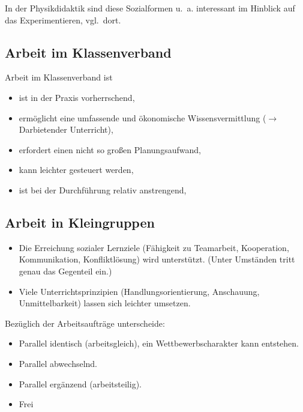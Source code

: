 In der Physikdidaktik sind  diese Sozialformen u.~a. interessant
im Hinblick auf das Experimentieren, vgl.\ dort.


\subsection{Arbeit im Klassenverband}

Arbeit im Klassenverband ist
\begin{itemize}
\item ist in der Praxis vorherrschend,
\item erm\"{o}glicht eine umfassende und \"{o}konomische
Wissensvermittlung ($\to$ Darbietender Unterricht),
\item erfordert einen nicht so gro{\ss}en Planungsaufwand,
\item kann leichter gesteuert werden,
\item ist bei der Durchf\"{u}hrung relativ anstrengend,
\end{itemize}



\subsection{Arbeit in Kleingruppen}

\begin{itemize}
\item Die Erreichung sozialer Lernziele
(F\"{a}higkeit zu Teamarbeit, Kooperation,
Kommunikation, Konfliktl\"{o}sung) wird unterst\"{u}tzt.
(Unter Umst\"{a}nden tritt genau das Gegenteil ein.)
\item Viele Unterrichtsprinzipien (Handlungsorientierung,
Anschauung, Unmittelbarkeit) lassen sich leichter umsetzen.
\end{itemize}

Bez\"{u}glich der Arbeitsauftr\"{a}ge unterscheide:
\begin{itemize}
\item
Parallel identisch (arbeitsgleich), ein
Wettbewerbscharakter kann entstehen.
\item
Parallel abwechselnd.
\item
Parallel erg\"{a}nzend (arbeitsteilig).
\item
Frei
\end{itemize}



